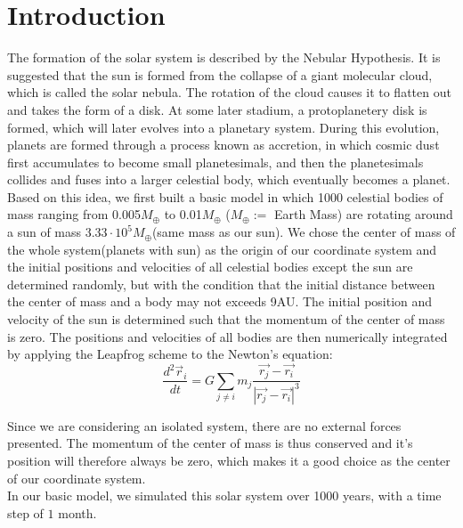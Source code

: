 \section{Introduction}
The formation of the solar system is described by the Nebular Hypothesis. It is suggested that the sun is formed from the collapse of a giant molecular cloud, which is called the solar nebula. The rotation of the cloud causes it to flatten out and takes the form of a disk. At some later stadium, a protoplanetery disk is formed, which will later evolves into a planetary system. During this evolution, planets are formed through a process known as accretion, in which cosmic dust first accumulates to become small planetesimals, and then the planetesimals collides and fuses into a larger celestial body, which eventually becomes a planet.\\

Based on this idea, we first built a basic model in which 1000 celestial bodies of mass ranging from 0.005$M_{\oplus}$ to 0.01$M_{\oplus}$ ($M_{\oplus}:=$ Earth Mass) are rotating around a sun of mass $3.33\cdot 10^5 M_{\oplus}$(same mass as our sun). We chose the center of mass of the whole system(planets with sun) as the origin of our coordinate system and the initial positions and velocities of all celestial bodies except the sun are determined randomly, but with the condition that the initial distance between the center of mass and a body may not exceeds 9AU. The initial position and velocity of the sun is determined such that the momentum of the center of mass is zero. The positions and velocities of all bodies are then numerically integrated by applying the Leapfrog scheme to the Newton's equation:
\[\frac{d^2\vec{r}_i}{dt}=G\sum_{j\neq i}m_j\frac{\vec{r_j}-\vec{r_i}}{|\vec{r_j}-\vec{r_i}|^3}\]

Since we are considering an isolated system, there are no external forces presented. The momentum of the center of mass is thus conserved and it's position will therefore always be zero, which makes it a good choice as the center of our coordinate system.\\

In our basic model, we simulated this solar system over 1000 years, with a time step of $1$ month.\\

